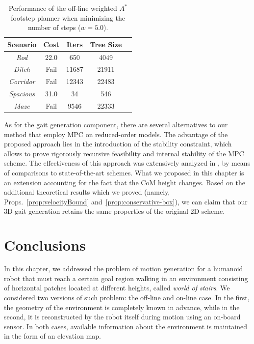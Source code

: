 \begin{table}
    \centering
    \begin{tabular}{*{5}{c}}
        Scenario & Cost & Iters & Tree Size \\
        \hline
        \textit{Rod} & 22.0 & 650 & 4049 \\
        \textit{Ditch} & Fail & 11687 & 21911 \\
        \textit{Corridor} & Fail & 12343 & 22483 \\
        \textit{Spacious} & 31.0 & 34 & 546 \\
        \textit{Maze} & Fail & 9546 & 22333
    \end{tabular}
    \caption{Performance of the off-line weighted $A^\ast$ footstep planner when minimizing the number of steps ($w=5.0$).}
    \label{tab:benchmark-wastar-w5}
\end{table}

As for the gait generation component, there are several alternatives to our method that employ MPC on reduced-order models. The advantage of the proposed approach lies in the introduction of the stability constraint, which allows to prove rigorously recursive feasibility and internal stability of the MPC scheme. The effectiveness of this approach was extensively analyzed in \cite{ScDeLaOr:20}, by means of comparisons to state-of-the-art schemes. What we proposed in this chapter is an extension accounting for the fact that the CoM height changes. Based on the additional theoretical results which we proved (namely, Props.~\ref{prop:velocityBound} and~\ref{prop:conservative-box}), we can claim that our 3D gait generation retains the same properties of the original 2D scheme. 

\section{Conclusions} 
\label{sec:WoS:Conclusions}


In this chapter, we addressed the problem of motion generation for a humanoid robot that must reach a certain goal region walking in an environment consisting of horizontal patches located at different heights, called \textit{world of stairs}.
We considered two versions of such problem: the off-line and on-line case. 
In the first, the geometry of the environment is completely known in advance, while in the second, it is reconstructed by the robot itself during motion using an on-board sensor. In both cases, available information about the environment is maintained in the form of an elevation map. 

